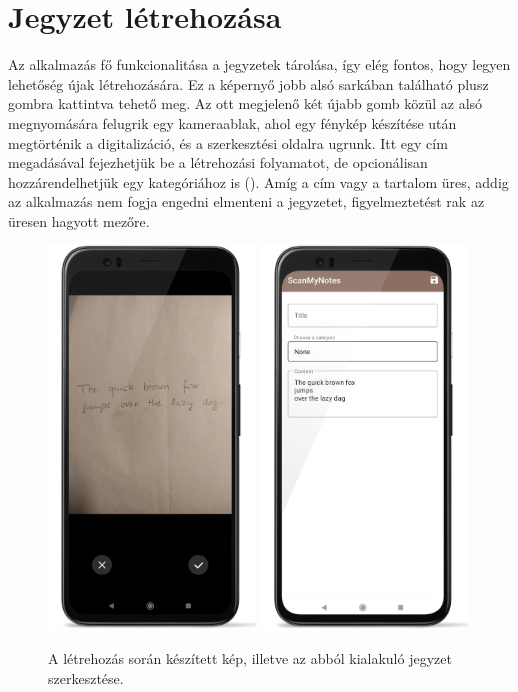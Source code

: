 \section{Jegyzet létrehozása}
Az alkalmazás fő funkcionalitása a jegyzetek tárolása, így elég fontos, hogy legyen lehetőség újak létrehozására. Ez a képernyő jobb alsó sarkában található plusz gombra kattintva tehető meg. Az ott megjelenő két újabb gomb közül az alsó megnyomására felugrik egy kameraablak, ahol egy fénykép készítése után megtörténik a digitalizáció, és a szerkesztési oldalra ugrunk. Itt egy cím megadásával fejezhetjük be a létrehozási folyamatot, de opcionálisan hozzárendelhetjük egy kategóriához is (). Amíg a cím vagy a tartalom üres, addig az alkalmazás nem fogja engedni elmenteni a jegyzetet, figyelmeztetést rak az üresen hagyott mezőre.
\begin{figure}[!ht]
	\centering
	\includegraphics[width=55mm, keepaspectratio]{figures/newnote_photo.png}
	\includegraphics[width=55mm, keepaspectratio]{figures/newnote_create.png}
	\caption{A létrehozás során készített kép, illetve az abból kialakuló jegyzet szerkesztése.}
	\label{fig:NewNoteScreen}
\end{figure}
\newpage

